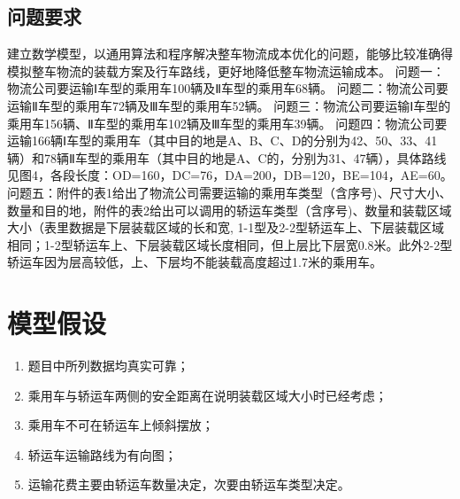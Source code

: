 \documentclass[UTF8]{ctexart}
\begin{document}


\subsection{问题要求}
建立数学模型，以通用算法和程序解决整车物流成本优化的问题，能够比较准确得模拟整车物流的装载方案及行车路线，更好地降低整车物流运输成本。
问题一：物流公司要运输Ⅰ车型的乘用车100辆及Ⅱ车型的乘用车68辆。
问题二：物流公司要运输Ⅱ车型的乘用车72辆及Ⅲ车型的乘用车52辆。
问题三：物流公司要运输Ⅰ车型的乘用车156辆、Ⅱ车型的乘用车102辆及Ⅲ车型的乘用车39辆。
问题四：物流公司要运输166辆Ⅰ车型的乘用车（其中目的地是A、B、C、D的分别为42、50、33、41辆）和78辆Ⅱ车型的乘用车（其中目的地是A、C的，分别为31、47辆），具体路线见图4，各段长度：OD=160，DC=76，DA=200，DB=120，BE=104，AE=60。
问题五：附件的表1给出了物流公司需要运输的乘用车类型（含序号)、尺寸大小、数量和目的地，附件的表2给出可以调用的轿运车类型（含序号)、数量和装载区域大小（表里数据是下层装载区域的长和宽, 1-1型及2-2型轿运车上、下层装载区域相同；1-2型轿运车上、下层装载区域长度相同，但上层比下层宽0.8米。此外2-2型轿运车因为层高较低，上、下层均不能装载高度超过1.7米的乘用车。

\section{模型假设}
\begin{enumerate}
	\item 	题目中所列数据均真实可靠；
	\item	乘用车与轿运车两侧的安全距离在说明装载区域大小时已经考虑；
	\item	乘用车不可在轿运车上倾斜摆放；
	\item	轿运车运输路线为有向图；
	\item	运输花费主要由轿运车数量决定，次要由轿运车类型决定。

\end{enumerate}
\end{document}
